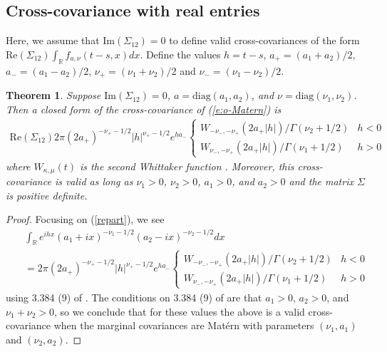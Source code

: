 \documentclass[11pt]{article}
\newtheorem{theorem}{Theorem}
\begin{document}
\subsection{Cross-covariance with real entries}\label{sec:re_ent}
Here, we assume that $\textrm{Im}(\Sigma_{12})=0$ to define valid cross-covariances of the form $\textrm{Re}(\Sigma_{12})\int_\mathbb{R} f_{a,\nu}(t-s, x) dx$.
Define the values $h = t-s$, $a_+ = (a_1 + a_2)/2$,  $a_- = (a_1 - a_2)/2$, $\nu_+ = (\nu_1 + \nu_2)/2$ and $\nu_- = (\nu_1 - \nu_2)/2$. 
\begin{theorem}\label{thm:re_ent}
Suppose $\textrm{Im}(\Sigma_{12}) = 0$, $a = \textrm{diag}(a_1, a_2)$, and $\nu = \textrm{diag}(\nu_1, \nu_2)$. Then a closed form of the cross-covariance of (\ref{e:o-Matern}) is \begin{align}
\textrm{Re}(\Sigma_{12})2\pi(2a_+)^{ -\nu_+ - 1/2} |h|^{\nu_+ -1/2}e^{ha_-} \begin{cases}
W_{-\nu_-, -\nu_+}(2a_+|h|)/\Gamma(\nu_2+1/2) & h < 0\\
W_{\nu_-, - \nu_+}(2a_+|h|)/\Gamma(\nu_1+1/2) & h > 0
\end{cases}\label{eq:whittaker}
\end{align}where $W_{\kappa, \mu}(t)$ is the second Whittaker function \citep{noauthor_table_2015}. Moreover, this cross-covariance is valid as long as $\nu_1 > 0$, $\nu_2 >0$, $a_1 > 0$, and $a_2 > 0$ and the matrix $\Sigma$ is positive definite.
\end{theorem}
\begin{proof}

Focusing on (\ref{repart}), we see \begin{align*}
&\int_\mathbb{R} e^{ihx}(a_1 + ix)^{-\nu_1 - 1/2}(a_2 - ix)^{-\nu_2 - 1/2} dx \\ \ \ \ &=2\pi(2a_+)^{ -\nu_+ - 1/2} |h|^{\nu_+ -1/2}e^{ha_-}\begin{cases}
W_{-\nu_-, -\nu_+}(2a_+|h|)/\Gamma(\nu_2+1/2) & h < 0\\
W_{\nu_-, - \nu_+}(2a_+|h|)/\Gamma(\nu_1+1/2) & h > 0
\end{cases}
\end{align*}using 3.384 (9) of \cite{noauthor_table_2015}. The conditions on 3.384 (9) of \cite{noauthor_table_2015} are that $a_1 >0$, $a_2 > 0$, and $\nu_1 + \nu_2 >0$, so we conclude that for these values the above is a valid cross-covariance when the marginal covariances are Mat\'ern with parameters $(\nu_1, a_1)$ and $(\nu_2, a_2)$. 
\end{proof}
\end{document}
